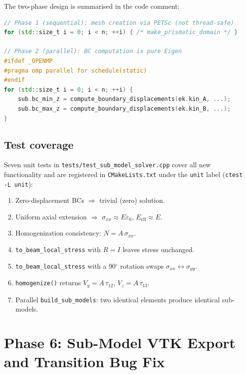 The two-phase design is summarised in the code comment:

\begin{lstlisting}[language=C++,caption={Two-phase build\_sub\_models},
                   label={lst:parallel_build}]
// Phase 1 (sequential): mesh creation via PETSc (not thread-safe)
for (std::size_t i = 0; i < n; ++i) { /* make_prismatic_domain */ }

// Phase 2 (parallel): BC computation is pure Eigen
#ifdef _OPENMP
#pragma omp parallel for schedule(static)
#endif
for (std::size_t i = 0; i < n; ++i) {
    sub.bc_min_z = compute_boundary_displacements(ek.kin_A, ...);
    sub.bc_max_z = compute_boundary_displacements(ek.kin_B, ...);
}
\end{lstlisting}

\subsection{Test coverage}

Seven unit tests in \texttt{tests/test\_sub\_model\_solver.cpp} cover all new
functionality and are registered in \texttt{CMakeLists.txt} under the
\texttt{unit} label (\verb|ctest -L unit|):

\begin{enumerate}
  \item Zero-displacement BCs $\Rightarrow$ trivial (zero) solution.
  \item Uniform axial extension $\Rightarrow$ $\sigma_{xx} \approx E\varepsilon_0$,
        $E_\text{eff} \approx E$.
  \item Homogenization consistency: $N = A\,\sigma_{xx}$.
  \item \texttt{to\_beam\_local\_stress} with $R = I$ leaves stress unchanged.
  \item \texttt{to\_beam\_local\_stress} with a 90$^\circ$ rotation swaps
        $\sigma_{xx} \leftrightarrow \sigma_{yy}$.
  \item \texttt{homogenize()} returns $V_y = A\,\tau_{12}$, $V_z = A\,\tau_{13}$.
  \item Parallel \texttt{build\_sub\_models}: two identical elements produce
        identical sub-models.
\end{enumerate}


\section{Phase 6: Sub-Model VTK Export and Transition Bug Fix}
\label{sec:phase6_vtk_export}

